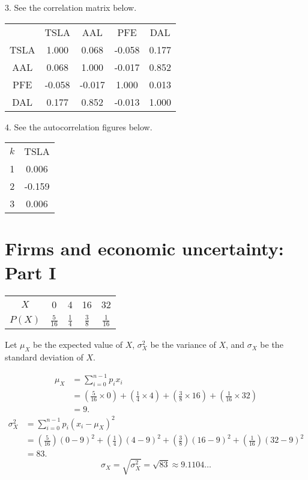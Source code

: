 \documentclass[12pt]{article}
\begin{document}
3. See the correlation matrix below.
\begin{center}
\begin{tabular}{c|c|c|c|c}
&TSLA&AAL&PFE&DAL\\
TSLA&1.000&0.068&-0.058&0.177\\
AAL&0.068&1.000&-0.017&0.852\\
PFE&-0.058&-0.017&1.000&0.013\\
DAL&0.177&0.852&-0.013&1.000
\end{tabular}
\end{center}
4. See the autocorrelation figures below.
\begin{center}\begin{tabular}{c|c}
$k$&TSLA\\
1&0.006\\
2&-0.159\\
3&0.006\\
\end{tabular}\end{center}
\section{Firms and economic uncertainty: Part I}
\begin{center}\begin{tabular}{c||c|c|c|c}
$X$&0&4&16&32\\
$P(X)$&$\frac{5}{16}$&$\frac{1}{4}$&$\frac{3}{8}$&$\frac{1}{16}$
\end{tabular}\end{center}

Let $\mu_X$ be the expected value of $X$, $\sigma^2_X$ be the variance of $X$, and $\sigma_X$ be the standard deviation of $X$.

\begin{align*}
\mu_X
&=\sum_{i=0}^{n-1}{p_ix_i}\\
&=\left(\frac{5}{16}\times0\right)+\left(\frac{1}{4}\times4\right)+\left(\frac{3}{8}\times16\right)+\left(\frac{1}{16}\times32\right)\\
&=9.
\end{align*}
\begin{align*}
\sigma^2_X
&=\sum_{i=0}^{n-1}{p_i}(x_i-\mu_X)^2\\
&=\left(\frac{5}{16}\right)(0-9)^2+\left(\frac{1}{4}\right)(4-9)^2+\left(\frac{3}{8}\right)(16-9)^2+\left(\frac{1}{16}\right)(32-9)^2\\
&=83.
\end{align*}
\[\sigma_X=\sqrt{\sigma^2_X}=\sqrt{83}\approx 9.1104\dots\]
\end{document}

